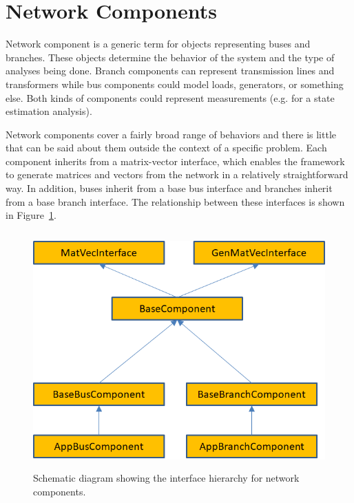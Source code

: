 \section{Network Components}\label{network_components}

Network component is a generic term for objects representing buses and branches. These objects determine the behavior of the system and the type of analyses being done. Branch components can represent transmission lines and transformers while bus components could model loads, generators, or something else. Both kinds of components could represent measurements (e.g. for a state estimation analysis). 

Network components cover a fairly broad range of behaviors and there is little
that can be said about them outside the context of a specific problem. Each
component inherits from a matrix-vector interface, which enables the framework
to generate matrices and vectors from the network in a relatively
straightforward way. In addition, buses inherit from a base bus interface and
branches inherit from a base branch interface. The relationship between these
interfaces is shown in Figure~\ref{fig:components}.

\begin{figure}
  \centering
  \includegraphics*[width=6in, height=3.58in, keepaspectratio=true]{figures/Component-hierarchy}
  \caption{Schematic diagram showing the interface hierarchy for network components.}
  \label{fig:components}
\end{figure}



